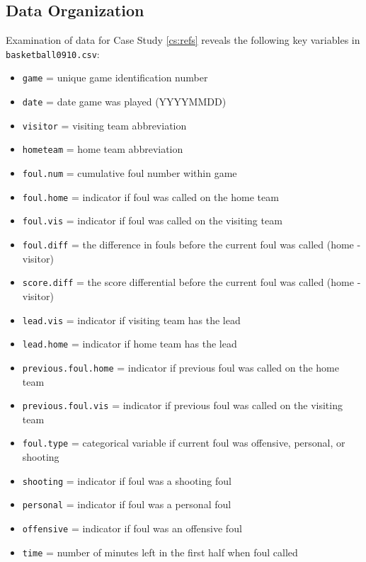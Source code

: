 \documentclass[
]{krantz}
\providecommand{\tightlist}{%
  \setlength{\itemsep}{0pt}\setlength{\parskip}{0pt}}
\begin{document}
\subsection{Data Organization}\label{data-organization-5}

Examination of data for Case Study \ref{cs:refs} reveals the following key variables in \texttt{basketball0910.csv}:

\begin{itemize}
\tightlist
\item
  \texttt{game} = unique game identification number
\item
  \texttt{date} = date game was played (YYYYMMDD)
\item
  \texttt{visitor} = visiting team abbreviation
\item
  \texttt{hometeam} = home team abbreviation
\item
  \texttt{foul.num} = cumulative foul number within game
\item
  \texttt{foul.home} = indicator if foul was called on the home team
\item
  \texttt{foul.vis} = indicator if foul was called on the visiting team
\item
  \texttt{foul.diff} = the difference in fouls before the current foul was called (home - visitor)
\item
  \texttt{score.diff} = the score differential before the current foul was called (home - visitor)
\item
  \texttt{lead.vis} = indicator if visiting team has the lead
\item
  \texttt{lead.home} = indicator if home team has the lead
\item
  \texttt{previous.foul.home} = indicator if previous foul was called on the home team
\item
  \texttt{previous.foul.vis} = indicator if previous foul was called on the visiting team
\item
  \texttt{foul.type} = categorical variable if current foul was offensive, personal, or shooting
\item
  \texttt{shooting} = indicator if foul was a shooting foul
\item
  \texttt{personal} = indicator if foul was a personal foul
\item
  \texttt{offensive} = indicator if foul was an offensive foul
\item
  \texttt{time} = number of minutes left in the first half when foul called
\end{itemize}
\end{document}

